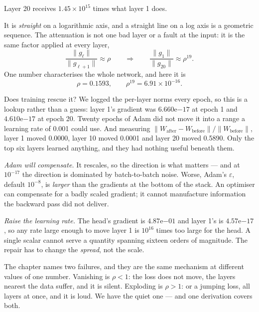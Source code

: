 \documentclass[11pt,a4paper]{article}
\begin{document}
Layer 20 receives $1.45\times10^{15}$ times what layer 1 does.

\begin{keybox}[title={The shape of that line is the finding}]
It is \emph{straight} on a logarithmic axis, and a straight line on a log axis
is a geometric sequence. The attenuation is not one bad layer or a fault at the
input: it is the same factor applied at every layer,
\[ \frac{\lVert g_\ell\rVert}{\lVert g_{\ell+1}\rVert} \approx \rho
   \qquad\Longrightarrow\qquad
   \frac{\lVert g_1\rVert}{\lVert g_{20}\rVert} \approx \rho^{19}. \]
One number characterises the whole network, and here it is
\[ \rho = 0.1593, \qquad \rho^{19} = 6.91\times10^{-16}. \]
\end{keybox}

Does training rescue it? We logged the per-layer norms every epoch, so this is
a lookup rather than a guess: layer 1's gradient was
$6.660\mathrm{e}{-17}$ at epoch 1 and $4.610\mathrm{e}{-17}$ at epoch 20.
Twenty epochs of Adam did not move it into a range a learning rate of 0.001
could use. And measuring
$\lVert W_{\text{after}} - W_{\text{before}}\rVert / \lVert W_{\text{before}}
\rVert$, layer 1 moved 0.0000, layer 10 moved 0.0001 and layer 20 moved 0.5890. Only
the top six layers learned anything, and they had nothing useful beneath
them.

\begin{failbox}[title={Failure condition --- two replies that do not work}]
\emph{Adam will compensate.} It rescales, so the direction is what matters ---
and at $10^{-17}$ the direction is dominated by batch-to-batch noise. Worse,
Adam's $\varepsilon$, default $10^{-8}$, is \emph{larger} than the gradients at
the bottom of the stack. An optimiser can compensate for a badly scaled
gradient; it cannot manufacture information the backward pass did not deliver.

\emph{Raise the learning rate.} The head's gradient is
$4.87\mathrm{e}{-01}$ and layer 1's is $4.57\mathrm{e}{-17}$, so any rate large
enough to move layer 1 is $10^{16}$ times too large for the head. A single
scalar cannot serve a quantity spanning sixteen orders of magnitude. The repair
has to change the \emph{spread}, not the scale.
\end{failbox}

The chapter names two failures, and they are the same mechanism at different
values of one number. Vanishing is $\rho < 1$: the loss does not move, the
layers nearest the data suffer, and it is silent. Exploding is $\rho > 1$:
 or a jumping loss, all layers at once, and it is loud. We have the
quiet one --- and one derivation covers both.
\end{document}
